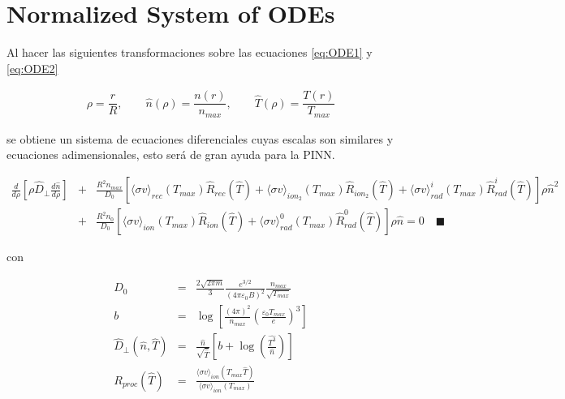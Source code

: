 \section{Normalized System of ODEs}
Al hacer las siguientes transformaciones sobre las ecuaciones \eqref{eq:ODE1}  y \eqref{eq:ODE2}

\begin{eqnarray*}
	\rho = \dfrac{r}{R}, \quad \quad \hat{n}(\rho) = \dfrac{n(r)}{n_{max}} , \quad \quad \hat{T}(\rho) = \dfrac{T(r)}{T_{max}}	
\end{eqnarray*}

se obtiene un sistema de ecuaciones diferenciales cuyas escalas son similares y ecuaciones adimensionales, esto será de gran ayuda para la PINN.

\begin{eqnarray}
	\frac{d}{d\rho}\left[\rho \hat{D}_\perp \frac{d\hat{n}}{d\rho}\right] &+& \frac{R^2n_{max}}{D_0}[ \langle \sigma v \rangle_{rec}(T_{max})\hat{R}_{rec}(\hat{T}) + \langle \sigma v \rangle_{ion_2}(T_{max})\hat{R}_{ion_2}(\hat{T}) + \langle \sigma v \rangle_{rad}^i(T_{max})\hat{R}^i_{rad}(\hat{T})] \rho\hat{n}^2 \nonumber \\
	&+& \frac{R^2 n_0}{D_0}[ \langle \sigma v \rangle_{ion}(T_{max})\hat{R}_{ion}(\hat{T}) + \langle \sigma v \rangle^0_{rad}(T_{max})\hat{R}^0_{rad}(\hat{T})]\rho \hat{n} = 0 \quad \blacksquare
\end{eqnarray}

con 

\begin{eqnarray}
	D_0 &=& \frac{2 \sqrt{2 \pi m}}{3}\frac{e^{3/2}}{(4\pi \varepsilon_0 B)^2}\frac{n_{max}}{\sqrt{T_{max}}} \\
	b &=&  \log{\left[\frac{(4\pi)^2}{n_{max}}\left(\frac{\varepsilon_0 T_{max}}{e}\right)^3\right]} \\
	\hat{D}_\perp(\hat{n},\hat{T}) &=& \frac{\hat{n}}{\sqrt{\hat{T}}} \left[ b + \log{\left(\frac{\hat{T^3}}{\hat{n}}\right)} \right]\\
	R_{proc}(\hat{T}) &=& \frac{\langle \sigma v\rangle_{ion}(T_{max}\hat{T})}{\langle \sigma v\rangle_{ion}(T_{max})}
\end{eqnarray}


